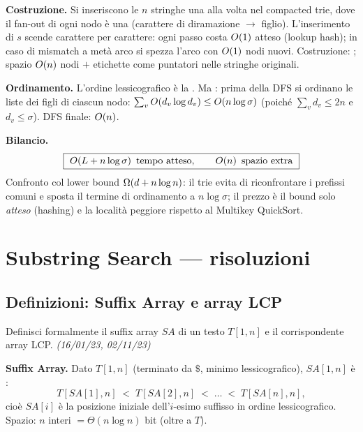 \textbf{Costruzione.} Si inseriscono le $n$ stringhe una alla volta nel compacted trie, dove il
fan-out di ogni nodo \`e una  (carattere di diramazione $\to$ figlio).
L'inserimento di $s$ scende carattere per carattere: ogni passo costa $O\!\left(1\right)$ atteso (lookup
hash); in caso di mismatch a met\`a arco si spezza l'arco con $O\!\left(1\right)$ nodi nuovi. Costruzione:
; spazio $O\!\left(n\right)$ nodi $+$ etichette come puntatori nelle stringhe originali.

\textbf{Ordinamento.} L'ordine lessicografico \`e la . Ma : prima della DFS si ordinano le
liste dei figli di ciascun nodo: $\sum_v O\!\left(d_v\log d_v\right)\le O\!\left(n\log\sigma\right)$ (poich\'e
$\sum_v d_v\le 2n$ e $d_v\le\sigma$). DFS finale: $O\!\left(n\right)$.

\textbf{Bilancio.}
\[
\boxed{\ \OO{L+n\log\sigma}\ \text{tempo atteso},\qquad \OO{n}\ \text{spazio extra}\ }
\]
Confronto col lower bound  $\Omega\!\left(d+n\log n\right)$: il trie evita di riconfrontare i prefissi
comuni e sposta il termine di ordinamento a $n\log\sigma$; il prezzo \`e il bound solo
\emph{atteso} (hashing) e la localit\`a peggiore rispetto al Multikey QuickSort.

\section{Substring Search --- risoluzioni}

\subsection*{ Definizioni: Suffix Array e array LCP}

\begin{domanda}
Definisci formalmente il suffix array $SA$ di un testo $T[1,n]$ e il corrispondente array LCP.
\emph{(16/01/23, 02/11/23)}
\end{domanda}

\textbf{Suffix Array.} Dato $T[1,n]$ (terminato da $\$$, minimo lessicografico), $\mathit{SA}[1,n]$
\`e :
\[
T[\mathit{SA}[1],n]\;<\;T[\mathit{SA}[2],n]\;<\;\dots\;<\;T[\mathit{SA}[n],n],
\]
cio\`e $\mathit{SA}[i]$ \`e la posizione iniziale dell'$i$-esimo suffisso in ordine
lessicografico. Spazio: $n$ interi $=\Theta(n\log n)$ bit (oltre a $T$).

